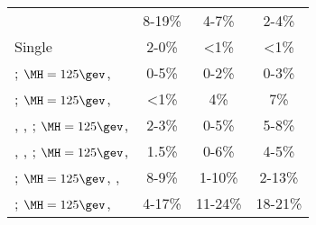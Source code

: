 \begin{frame}
\begin{columns}[T]
\begin{column}{0.48\textwidth}
\begin{table}[htbp]
\begin{center}
\begin{tabular}{|p{2.5cm}|c|c|c|}
					\ttbar                                     & 8-19\%  & 4-7\%   & 2-4\%   \\
					Single \cPqt                               & 2-0\%   & <1\%    & <1\%    \\\hline
					\ggH; \newline $\MH=\text{125}\gev$, \HWW           & 0-5\%   & 0-2\%   & 0-3\%   \\
					\qqH; \newline $\MH=\text{125}\gev$, \HWW           & <1\%    & 4\%     & 7\%     \\
					\WH, \ZH, \ttH; \newline $\MH=\text{125}\gev$, \HWW & 2-3\%   & 0-5\%   & 5-8\%   \\\hline
					\WH, \ZH, \ttH; \newline $\MH=\text{125}\gev$, \HZZ & 1.5\%   & 0-6\%   & 4-5\%   \\
					\WH; $\MH=\text{125}\gev$, \newline \Hbb, \Wlv      & 8-9\%   & 1-10\%  & 2-13\%  \\
					\ttH; $\MH=\text{125}\gev$, \Hbb           & 4-17\%  & 11-24\% & 18-21\% \\\hline
				\end{tabular}
			\end{center}
			\end{table}
		\end{column}
	\end{columns}
\end{frame}